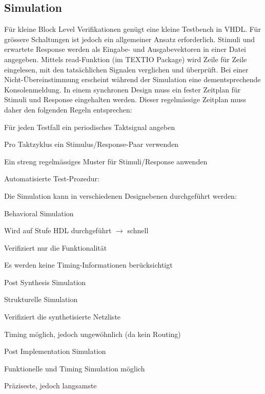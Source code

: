 \subsection{Simulation}$~$ \\
Für kleine Block Level Verifikationen genügt eine kleine Testbench in VHDL. Für grössere Schaltungen ist jedoch ein allgemeiner Ansatz erforderlich. Stimuli und erwartete Response werden als Eingabe- und Ausgabevektoren in einer Datei angegeben. Mittels read-Funktion (im TEXTIO Package) wird Zeile für Zeile eingelesen, mit den tatsächlichen Signalen verglichen und überprüft. Bei einer Nicht-Übereinstimmung erscheint während der Simulation eine dementsprechende Konsolenmeldung. In einem synchronen Design muss ein fester Zeitplan für Stimuli und Response eingehalten werden. Dieser regelmässige Zeitplan muss daher den folgenden Regeln entsprechen:
\begin{compactitem}
    \item Für jeden Testfall ein periodisches Taktsignal angeben
    \item Pro Taktzyklus ein Stimulus/Response-Paar verwenden
    \item Ein streng regelmässiges Muster für Stimuli/Response anwenden
\end{compactitem}
Automatisierte Test-Prozedur:

Die Simulation kann in verschiedenen Designebenen durchgeführt werden:
\begin{multicols}{3}
    \begin{compactitem}
        \item Behavioral Simulation
        \begin{compactitem}
            \item Wird auf Stufe HDL durchgeführt $\rightarrow$ schnell
            \item Verifiziert nur die Funktionalität
            \item Es werden keine Timing-Informationen berücksichtigt
        \end{compactitem}
        \item Post Synthesis Simulation
        \begin{compactitem}
            \item Strukturelle Simulation
            \item Verifiziert die synthetisierte Netzliste
            \item Timing möglich, jedoch ungewöhnlich (da kein Routing) \ \\
        \end{compactitem}
        \item Post Implementation Simulation
        \begin{compactitem}
            \item Funktionelle und Timing Simulation möglich
            \item Präziseste, jedoch langsamste
        \end{compactitem} \ \\
    \end{compactitem}
\end{multicols}

